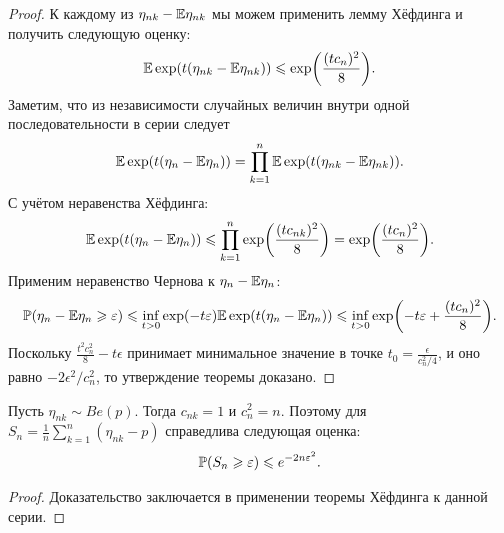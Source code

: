 \begin{proof}
    К каждому из $\eta_{nk} - \Ex \eta_{nk}$ мы можем применить лемму Хёфдинга и получить следующую оценку:
    \[
        \Ex \exp({t(\eta_{nk} - \Ex\eta_{nk})}) \leq \exp\biggr({\frac{(tc_n)^2}{8}}\biggr).
    \]
    Заметим, что из независимости случайных величин внутри одной последовательности в серии следует
    \[
        \Ex \exp({t(\eta_n - \Ex \eta_n)}) = \prod_{k = 1}^n \Ex \exp({t(\eta_{nk} - \Ex\eta_{nk})}).
    \]
    С учётом неравенства Хёфдинга:
    \[
        \Ex \exp({t(\eta_n - \Ex \eta_n)}) \leq \prod\limits_{k = 1}^n \exp\biggr({\frac{(tc_{nk})^2}{8}}\biggr) = \exp\biggr({\frac{(tc_n)^2}{8}}\biggr).
    \]
    Применим неравенство Чернова к $\eta_n - \Ex\eta_n$:
    \begin{equation*}
        \P(\eta_n - \Ex\eta_n \geq \epsilon) \leq \inf\limits_{t > 0} \exp({-t\epsilon})\Ex \exp({t(\eta_n - \Ex \eta_n)}) \leq \inf\limits_{t > 0} \exp\biggr({-t\epsilon} + \frac{(tc_n)^2}{8}\biggr).
    \end{equation*}
    Поскольку $\frac{t^2c_n^2}{8} - t\epsilon$ принимает минимальное значение в точке $t_0 = \frac{\epsilon}{c_n^2/4}$, и оно равно $-2\epsilon^2/c_n^2$, то утверждение теоремы доказано.
\end{proof}
\begin{corollary}
    Пусть $\eta_{nk} \sim Be(p)$. Тогда $c_{nk} = 1$ и $c_n^2 = n$. Поэтому для $S_n = \frac{1}{n}\sum_{k = 1}^n (\eta_{nk} - p)$ справедлива следующая оценка:
    \[
        \P(S_n \geq \epsilon) \leq e^{-2n\epsilon^2}.
    \]
\end{corollary}
\begin{proof}
    Доказательство заключается в применении теоремы Хёфдинга к данной серии.
\end{proof}
